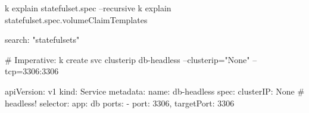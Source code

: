\begin{tcbitemize}[
  raster columns=2, raster equal height=rows,
  blanker, cheat subtitle
]
\begin{tcbitemize}[
      raster columns=1, raster equal height=rows,
      blanker, cheat subtitle
    ]
\begin{tcolorbox}
        \end{tcolorbox}


      \tcbitem

        \begin{cheatcodebash}
        k explain statefulset.spec --recursive
        k explain statefulset.spec.volumeClaimTemplates
        \end{cheatcodebash}

        \begin{cheatcodebash}
        search: "statefulsets"
        \end{cheatcodebash}


     \tcbitem

        \begin{cheatcodebash}
        # Imperative:
        k create svc clusterip db-headless --clusterip="None" --tcp=3306:3306
        \end{cheatcodebash}
        \begin{cheatcodebash}
        apiVersion: v1
        kind: Service
        metadata: {name: db-headless}
        spec:
          clusterIP: None            # headless!
          selector: {app: db}
          ports:
          - {port: 3306, targetPort: 3306}
        \end{cheatcodebash}

    \end{tcbitemize}

\end{tcbitemize}
